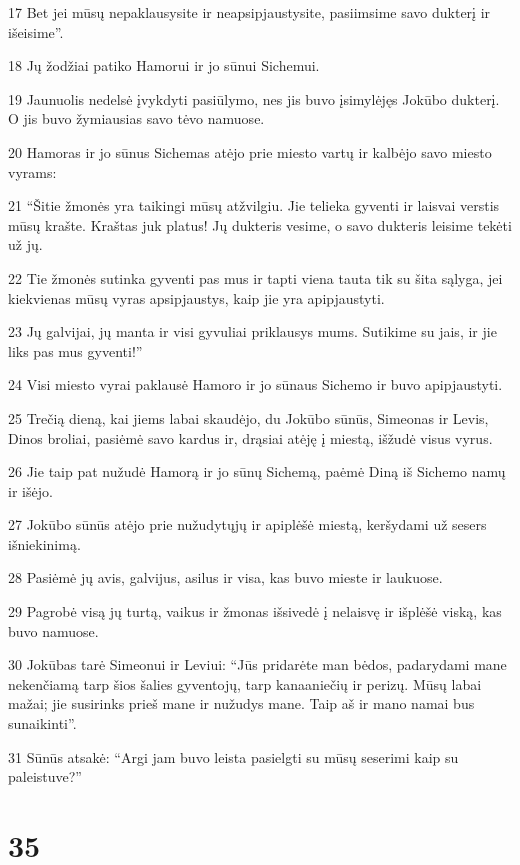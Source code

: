 \par 17 Bet jei mūsų nepaklausysite ir neapsipjaustysite, pasiimsime savo dukterį ir išeisime”. 
\par 18 Jų žodžiai patiko Hamorui ir jo sūnui Sichemui. 
\par 19 Jaunuolis nedelsė įvykdyti pasiūlymo, nes jis buvo įsimylėjęs Jokūbo dukterį. O jis buvo žymiausias savo tėvo namuose. 
\par 20 Hamoras ir jo sūnus Sichemas atėjo prie miesto vartų ir kalbėjo savo miesto vyrams: 
\par 21 “Šitie žmonės yra taikingi mūsų atžvilgiu. Jie telieka gyventi ir laisvai verstis mūsų krašte. Kraštas juk platus! Jų dukteris vesime, o savo dukteris leisime tekėti už jų. 
\par 22 Tie žmonės sutinka gyventi pas mus ir tapti viena tauta tik su šita sąlyga, jei kiekvienas mūsų vyras apsipjaustys, kaip jie yra apipjaustyti. 
\par 23 Jų galvijai, jų manta ir visi gyvuliai priklausys mums. Sutikime su jais, ir jie liks pas mus gyventi!” 
\par 24 Visi miesto vyrai paklausė Hamoro ir jo sūnaus Sichemo ir buvo apipjaustyti. 
\par 25 Trečią dieną, kai jiems labai skaudėjo, du Jokūbo sūnūs, Simeonas ir Levis, Dinos broliai, pasiėmė savo kardus ir, drąsiai atėję į miestą, išžudė visus vyrus. 
\par 26 Jie taip pat nužudė Hamorą ir jo sūnų Sichemą, paėmė Diną iš Sichemo namų ir išėjo. 
\par 27 Jokūbo sūnūs atėjo prie nužudytųjų ir apiplėšė miestą, keršydami už sesers išniekinimą. 
\par 28 Pasiėmė jų avis, galvijus, asilus ir visa, kas buvo mieste ir laukuose. 
\par 29 Pagrobė visą jų turtą, vaikus ir žmonas išsivedė į nelaisvę ir išplėšė viską, kas buvo namuose. 
\par 30 Jokūbas tarė Simeonui ir Leviui: “Jūs pridarėte man bėdos, padarydami mane nekenčiamą tarp šios šalies gyventojų, tarp kanaaniečių ir perizų. Mūsų labai mažai; jie susirinks prieš mane ir nužudys mane. Taip aš ir mano namai bus sunaikinti”. 
\par 31 Sūnūs atsakė: “Argi jam buvo leista pasielgti su mūsų seserimi kaip su paleistuve?”



\chapter{35}

